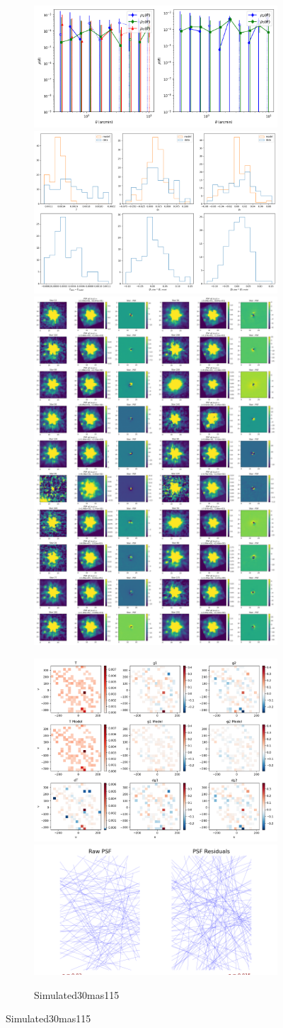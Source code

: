 \documentclass[a4 paper]{article}
\numberwithin{equation}{section}
\newcommand{\0}{\mathbf{0}}
\begin{document}
\begin{figure}[!h]
  \begin{subfigure}{\linewidth}
  \includegraphics[width=.3\linewidth]{Simulated30mas115/piff_rho.png}\hfill
  \includegraphics[width=.3\linewidth]{Simulated30mas115/piff_shapes.png}\hfill
  \includegraphics[width=.3\linewidth]{Simulated30mas115/piff_stars.png}
  \end{subfigure}\par\medskip
  \begin{subfigure}{\linewidth}
  \includegraphics[width=.3\linewidth]{Simulated30mas115/piff_twod.png}\hfill
  \includegraphics[width=.3\linewidth]{Simulated30mas115/piff_whisker.png}\hfill
  \caption{Simulated30mas115}
  \end{subfigure}\par\medskip


\end{figure}
\end{document}
